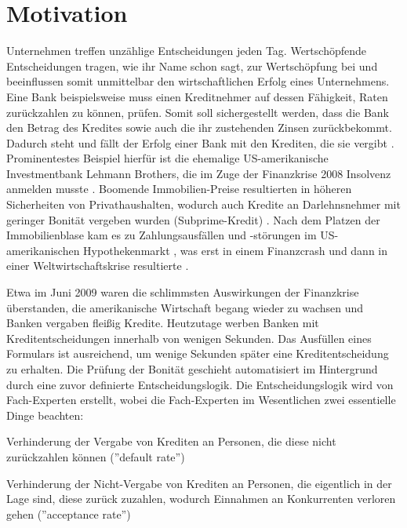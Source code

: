 \chapter{Motivation}
\label{ch:Motivation1}
 
Unternehmen treffen unzählige Entscheidungen jeden Tag. Wertschöpfende Entscheidungen tragen, wie ihr Name schon sagt, zur Wertschöpfung bei und beeinflussen somit unmittelbar den wirtschaftlichen Erfolg eines Unternehmens. Eine Bank beispielsweise muss einen Kreditnehmer auf dessen Fähigkeit, Raten zurückzahlen zu können, prüfen. Somit soll sichergestellt werden, dass die Bank den Betrag des Kredites sowie auch die ihr zustehenden Zinsen zurückbekommt. Dadurch steht und fällt der Erfolg einer Bank mit den Krediten, die sie vergibt \cite[vgl. S. 1]{AF04}. Prominentestes Beispiel hierfür ist die ehemalige US-amerikanische Investmentbank Lehmann Brothers, die im Zuge der Finanzkrise 2008 Insolvenz anmelden musste \cite[vgl. S. 3]{WN09}. Boomende Immobilien-Preise resultierten in höheren Sicherheiten von Privathaushalten, wodurch auch Kredite an Darlehnsnehmer mit geringer Bonität vergeben wurden (Subprime-Kredit) \cite[vgl. S. 82-83]{MB09}. Nach dem Platzen der Immobilienblase kam es zu Zahlungsausfällen und -störungen im US-amerikanischen Hypothekenmarkt \cite[vgl. S. 6 ff.]{RK10}, was erst in einem Finanzcrash und dann in einer Weltwirtschaftskrise resultierte \cite[vgl. S. 109]{LG09}.

Etwa im Juni 2009 waren die schlimmsten Auswirkungen der Finanzkrise überstanden, die amerikanische Wirtschaft begang wieder zu wachsen \cite[vgl. S. 21]{HR10} und Banken vergaben fleißig Kredite. Heutzutage werben Banken mit Kreditentscheidungen innerhalb von wenigen Sekunden. Das Ausfüllen eines Formulars ist ausreichend, um wenige Sekunden später eine Kreditentscheidung zu erhalten. Die Prüfung der Bonität geschieht automatisiert im Hintergrund durch eine zuvor definierte Entscheidungslogik. Die Entscheidungslogik wird von Fach-Experten erstellt, wobei die Fach-Experten im Wesentlichen zwei essentielle Dinge beachten:
 
\begin{enumerate*}
\item Verhinderung der Vergabe von Krediten an Personen, die diese 
nicht zurückzahlen können (''default rate'') 
\item Verhinderung der Nicht-Vergabe von Krediten an Personen, die eigentlich in der Lage 
sind, diese zurück zuzahlen, wodurch Einnahmen an Konkurrenten 
verloren gehen (''acceptance rate'') \end{enumerate*}

